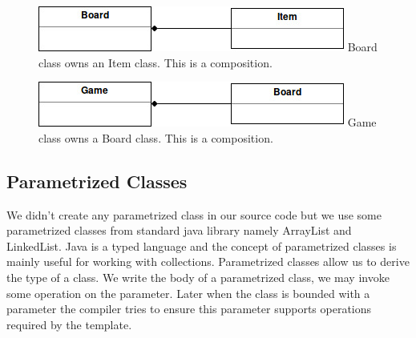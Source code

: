 \documentclass{article}
\begin{document}
\begin{figure}[H]
\includegraphics[scale=0.95]{Images/Board.jpg} 
Board class owns an Item class. This is a composition.
\end{figure}

\begin{figure}[H]
\includegraphics[scale=0.95]{Images/Game.jpg} 
Game class owns a Board class. This is a composition.
\end{figure}

\subsection{Parametrized Classes}
We didn't create any parametrized class in our source code but we use some parametrized classes from standard java library namely ArrayList and LinkedList. Java is a typed language and the concept of parametrized classes is mainly useful for working with collections. Parametrized classes allow us to derive the type of a class. We write the body of a parametrized class, we may invoke some operation on the parameter. Later when the class is bounded with a parameter the compiler tries to ensure this parameter supports operations required by the template.
\end{document}
